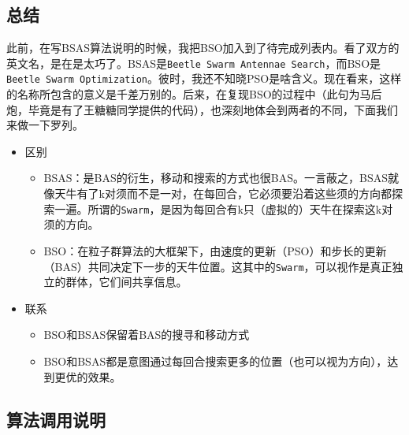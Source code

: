 \documentclass[]{ctexbook}
\providecommand{\tightlist}{%
  \setlength{\itemsep}{0pt}\setlength{\parskip}{0pt}}
\theoremstyle{definition}
\theoremstyle{definition}
\theoremstyle{definition}
\theoremstyle{remark}
\begin{document}
\subsection{总结}

此前，在写BSAS算法说明的时候，我把BSO加入到了待完成列表内。看了双方的英文名，是在是太巧了。BSAS是\texttt{Beetle\ Swarm\ Antennae\ Search}，而BSO是\texttt{Beetle\ Swarm\ Optimization}。彼时，我还不知晓PSO是啥含义。现在看来，这样的名称所包含的意义是千差万别的。后来，在复现BSO的过程中（此句为马后炮，毕竟是有了王糖糖同学提供的代码），也深刻地体会到两者的不同，下面我们来做一下罗列。

\begin{itemize}
\tightlist
\item
  区别

  \begin{itemize}
  \tightlist
  \item
    BSAS：是BAS的衍生，移动和搜索的方式也很BAS。一言蔽之，BSAS就像天牛有了k对须而不是一对，在每回合，它必须要沿着这些须的方向都探索一遍。所谓的\texttt{Swarm}，是因为每回合有k只（虚拟的）天牛在探索这k对须的方向。
  \item
    BSO：在粒子群算法的大框架下，由速度的更新（PSO）和步长的更新（BAS）共同决定下一步的天牛位置。这其中的\texttt{Swarm}，可以视作是真正独立的群体，它们间共享信息。
  \end{itemize}
\item
  联系

  \begin{itemize}
  \tightlist
  \item
    BSO和BSAS保留着BAS的搜寻和移动方式
  \item
    BSO和BSAS都是意图通过每回合搜索更多的位置（也可以视为方向），达到更优的效果。
  \end{itemize}
\end{itemize}

\subsection{算法调用说明}\label{BSOparms}
\end{document}
